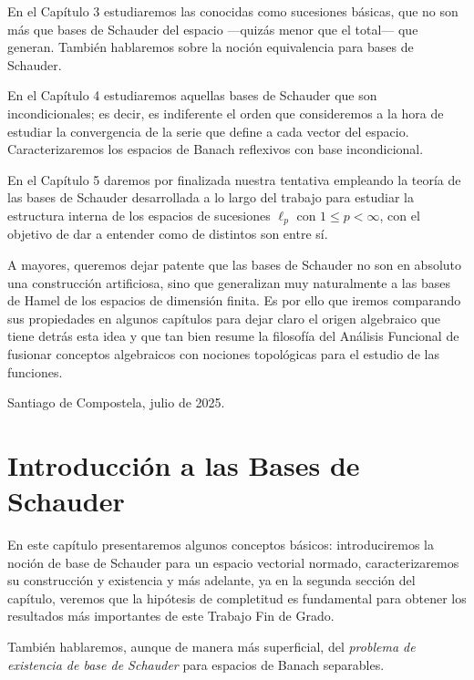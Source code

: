	En el Capítulo 3 estudiaremos las conocidas como sucesiones básicas, que no son más que bases de Schauder del espacio ---quizás menor que el total--- que generan. También hablaremos sobre la noción equivalencia para bases de Schauder.
	
	En el Capítulo 4 estudiaremos aquellas bases de Schauder que son incondicionales; es decir, es indiferente el orden que consideremos a la hora de estudiar la convergencia de la serie que define a cada vector del espacio. Caracterizaremos los espacios de Banach reflexivos con base incondicional.
	
	En el Capítulo 5 daremos por finalizada nuestra tentativa empleando la teoría de las bases de Schauder desarrollada a lo largo del trabajo para estudiar la estructura interna de los espacios de sucesiones $\ell_p$ con $1\leq p<\infty$, con el objetivo de dar a entender como de distintos son entre sí. 
	
	A mayores, queremos dejar patente que las bases de Schauder no son en absoluto una construcción artificiosa, sino que generalizan muy naturalmente a las bases de Hamel de los espacios de dimensión finita. Es por ello que iremos comparando sus propiedades en algunos capítulos para dejar claro el origen algebraico que tiene detrás esta idea y que tan bien resume la filosofía del Análisis Funcional de fusionar conceptos algebraicos con nociones topológicas para el estudio de las funciones.
	
	\begin{flushright}
		Santiago de Compostela, julio de 2025.
	\end{flushright}
	

	\mainmatter\pagestyle{fancy}\setlength{\parskip}{1.3mm}
	
	\chapter{Introducción a las Bases de Schauder}
	
	En este capítulo presentaremos algunos conceptos básicos: introduciremos la noción de base de Schauder para un espacio vectorial normado, caracterizaremos su construcción y existencia y más adelante, ya en la segunda sección del capítulo, veremos que la hipótesis de completitud es fundamental para obtener los resultados más importantes de este Trabajo Fin de Grado.
	
	También hablaremos, aunque de manera más superficial, del \textit{problema de existencia de base de Schauder} para espacios de Banach separables.
	

